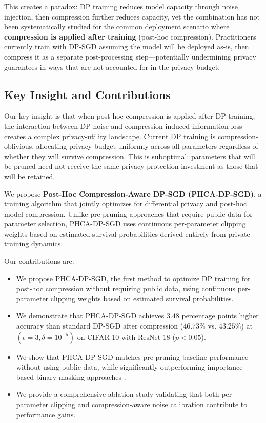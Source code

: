 \documentclass[11pt,a4paper]{article}
\begin{document}
This creates a paradox: DP training reduces model capacity through noise injection, then compression further reduces capacity, yet the combination has not been systematically studied for the common deployment scenario where \textbf{compression is applied after training} (post-hoc compression). Practitioners currently train with DP-SGD assuming the model will be deployed as-is, then compress it as a separate post-processing step---potentially undermining privacy guarantees in ways that are not accounted for in the privacy budget.

\subsection{Key Insight and Contributions}

Our key insight is that when post-hoc compression is applied after DP training, the interaction between DP noise and compression-induced information loss creates a complex privacy-utility landscape. Current DP training is compression-oblivious, allocating privacy budget uniformly across all parameters regardless of whether they will survive compression. This is suboptimal: parameters that will be pruned need not receive the same privacy protection investment as those that will be retained.

We propose \textbf{Post-Hoc Compression-Aware DP-SGD (PHCA-DP-SGD)}, a training algorithm that jointly optimizes for differential privacy and post-hoc model compression. Unlike pre-pruning approaches \citep{adamczewski2023prepruning} that require public data for parameter selection, PHCA-DP-SGD uses continuous per-parameter clipping weights based on estimated survival probabilities derived entirely from private training dynamics.

Our contributions are:
\begin{itemize}
    \item We propose PHCA-DP-SGD, the first method to optimize DP training for post-hoc compression without requiring public data, using continuous per-parameter clipping weights based on estimated survival probabilities.
    \item We demonstrate that PHCA-DP-SGD achieves $3.48$ percentage points higher accuracy than standard DP-SGD after compression ($46.73\%$ vs. $43.25\%$) at $(\epsilon=3, \delta=10^{-5})$ on CIFAR-10 with ResNet-18 ($p<0.05$).
    \item We show that PHCA-DP-SGD matches pre-pruning baseline performance without using public data, while significantly outperforming importance-based binary masking approaches \citep{zhang2025adadpigu}.
    \item We provide a comprehensive ablation study validating that both per-parameter clipping and compression-aware noise calibration contribute to performance gains.
\end{itemize}
\end{document}
